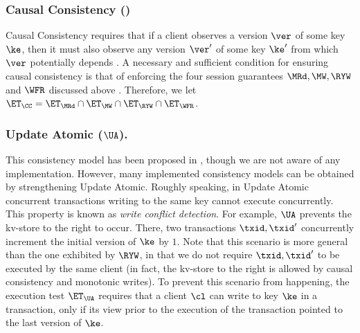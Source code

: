\subsubsection{Causal Consistency (\CC)}
Causal Consistency requires that if a client observes a version 
$\ver$ of some key $\ke$, then it must also observe any version $\ver'$ of some key $\ke'$ 
from which $\ver$ potentially depends \cite{cops}. A necessary and sufficient condition 
for ensuring causal consistency is that of enforcing the four session guarantees $\MRd, \MW, \RYW$ and $\WFR$ 
discussed above \cite{session2causal}. Therefore, we let $\ET_{\CC} = \ET_{\MRd} \cap \ET_{\MW} 
\cap \ET_{\RYW} \cap \ET_{\WFR}$. 

\subsubsection{Update Atomic ($\UA$).}
This consistency model has been proposed in \cite{framework-concur}, though we 
are not aware of any implementation. However, many implemented consistency models 
can be obtained by strengthening Update Atomic. Roughly speaking, in Update Atomic 
concurrent transactions writing to the same key cannot execute concurrently. This property 
is known as \emph{write conflict detection}. For example, $\UA$ prevents the kv-store to 
the right to occur. There, two transactions $\txid, \txid'$ concurrently increment the initial 
version of $\ke$ by $1$. Note that this scenario is more general than the one exhibited by 
$\RYW$, in that we do not require $\txid, \txid'$ to be executed by the same client 
(in fact, the kv-store to the right is allowed by causal consistency and monotonic writes).
To prevent this scenario from happening, the execution test $\ET_{\UA}$ requires 
that a client $\cl$ can write to key $\ke$ in a transaction, only if its view prior 
to the execution of the transaction pointed to the last version of $\ke$.

